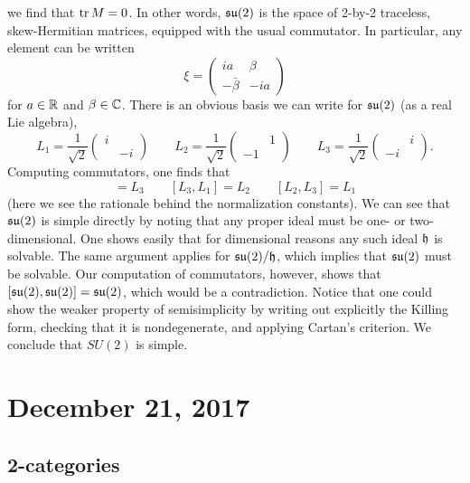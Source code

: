 \documentclass{amsart}
\begin{document}
we find that $\operatorname{tr} M=0$. In other words, $\mathfrak{su}(2)$ is the space of 2-by-2 traceless,
skew-Hermitian matrices, equipped with the usual commutator. In particular,
any element can be written
\begin{equation*}
    \xi =
    \begin{pmatrix}
        ia & \beta \\ -\bar\beta & -ia
    \end{pmatrix}
\end{equation*}
for $a\in\mathbb{R}$ and $\beta\in\mathbb{C}$. There is an obvious basis we can write for
$\mathfrak{su}(2)$ (as a real Lie algebra),
\begin{equation*}
    L_1 = \frac{1}{\sqrt{2}}
    \begin{pmatrix}
        i & \\ & -i
    \end{pmatrix}
    \qquad
    L_2 = \frac{1}{\sqrt{2}}
    \begin{pmatrix}
         & 1\\ -1&
    \end{pmatrix}
    \qquad
    L_3 = \frac{1}{\sqrt{2}}
    \begin{pmatrix}
         & i\\ -i&
    \end{pmatrix}.
\end{equation*}
Computing commutators, one finds that
\begin{equation*}
    [L_1, L_2] = L_3 \qquad [L_3, L_1] = L_2 \qquad [L_2, L_3] = L_1
\end{equation*}
(here we see the rationale behind the normalization constants).
We can see that $\mathfrak{su}(2)$ is simple directly by noting that any proper
ideal must be one- or two-dimensional. One shows easily that for dimensional
reasons any such ideal $\mathfrak h$ is solvable. The same argument applies for
$\mathfrak{su}(2)/\mathfrak h$, which implies that $\mathfrak{su}(2)$ must be solvable.
Our computation of commutators, however, shows that
$[\mathfrak{su}(2),\mathfrak{su}(2)] = \mathfrak{su}(2)$, which would be a contradiction.
Notice that one could show the weaker property of semisimplicity
by writing out explicitly the Killing form, checking that it is nondegenerate,
and applying Cartan's criterion. We conclude that $SU(2)$ is simple.

\section{December 21, 2017}

\subsection{2-categories}
\end{document}
